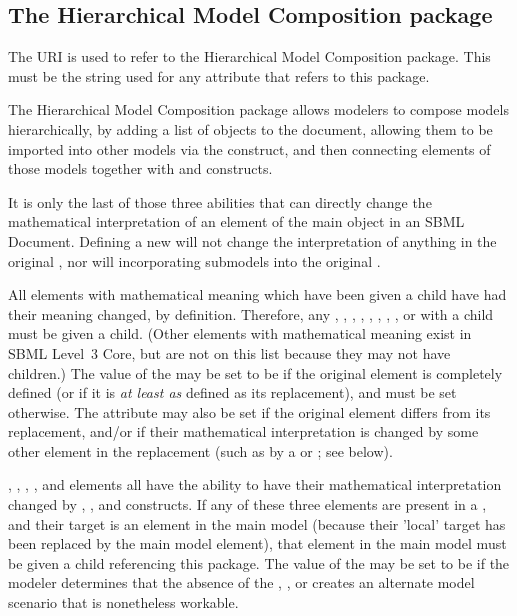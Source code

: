 \subsection{The Hierarchical Model Composition package}

The URI  is used to refer to the Hierarchical Model Composition package.  This must be the string used for any  attribute that refers to this package.

The Hierarchical Model Composition package allows modelers to compose models hierarchically, by adding a list of \Model objects to the document, allowing them to be imported into other models via the \Submodel construct, and then connecting elements of those models together with \ReplacedElement and \ReplacedBy constructs.

It is only the last of those three abilities that can directly change the mathematical interpretation of an element of the main \Model object in an SBML Document.  Defining a new \Model will not change the interpretation of anything in the original \Model, nor will incorporating submodels into the original \Model.

All elements with mathematical meaning which have been given a \ReplacedBy child have had their meaning changed, by definition.  Therefore, any \Compartment, \Parameter, \Reaction, \Species, \Constraint, \Event, \FunctionDefinition, \InitialAssignment, or \Rule with a \ReplacedBy child must be given a \MathChangedClaim child.  (Other elements with mathematical meaning exist in SBML Level~3 Core, but are not on this list because they may not have \ReplacedBy children.)  The value of the  may be set to be  if the original element is completely defined (or if it is \emph{at least as} defined as its replacement), and must be set  otherwise.  The attribute may also be set  if the original element differs from its replacement, and/or if their mathematical interpretation is changed by some other element in the replacement (such as by a \Rule or \Reaction; see below).

\Compartment, \Parameter, \Reaction, \Species, and \SpeciesReference elements all have the ability to have their mathematical interpretation changed by \InitialAssignment, \Rule, and \Event constructs.  If any of these three elements are present in a \Submodel, and their target is an element in the main model (because their 'local' target has been replaced by the main model element), that element in the main model must be given a \MathChangedClaim child referencing this package.  The value of the  may be set to be  if the modeler determines that the absence of the \InitialAssignment, \Rule, or \Event creates an alternate model scenario that is nonetheless workable.

